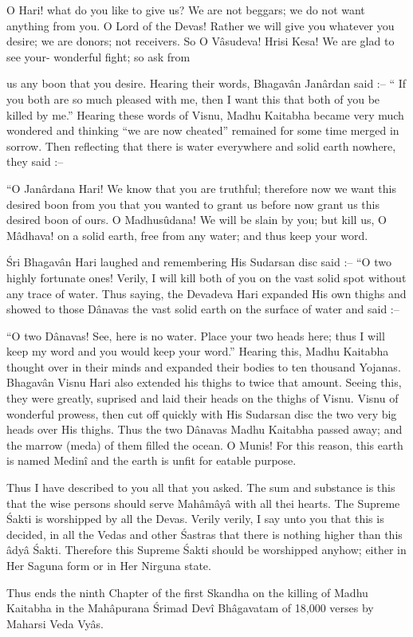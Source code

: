 O Hari! what do you like to give us? We are not beggars; we do not want anything from you. O Lord of the Devas! Rather we will give you whatever you desire; we are donors; not receivers. So O V\^asudeva! Hrisi Kesa! We are glad to see your- wonderful fight; so ask from

us any boon that you desire. Hearing their words, Bhagav\^an Jan\^ardan said :-- `` If you both are so much pleased with me, then I want this that both of you be killed by me.'' Hearing these words of Visnu, Madhu Kaitabha became very much wondered and thinking ``we are now cheated'' remained for some time merged in sorrow. Then reflecting that there is water everywhere and solid earth nowhere, they said :--

``O Jan\^ardana Hari! We know that you are truthful; therefore now we want this desired boon from you that you wanted to grant us before now grant us this desired boon of ours. O Madhus\^udana! We will be slain by you; but kill us, O M\^adhava! on a solid earth, free from any water; and thus keep your word.

\'Sri Bhagav\^an Hari laughed and remembering His Sudarsan disc said :-- ``O two highly fortunate ones! Verily, I will kill both of you on the vast solid spot without any trace of water. Thus saying, the Devadeva Hari expanded His own thighs and showed to those D\^anavas the vast solid earth on the surface of water and said :--

``O two D\^anavas! See, here is no water. Place your two heads here; thus I will keep my word and you would keep your word.'' Hearing this, Madhu Kaitabha thought over in their minds and expanded their bodies to ten thousand Yojanas. Bhagav\^an Visnu Hari also extended his thighs to twice that amount. Seeing this, they were greatly, suprised and laid their heads on the thighs of Visnu. Visnu of wonderful prowess, then cut off quickly with His Sudarsan disc the two very big heads over His thighs. Thus the two D\^anavas Madhu Kaitabha passed away; and the marrow (meda) of them filled the ocean. O Munis! For this reason, this earth is named Medin\^i and the earth is unfit for eatable purpose.

Thus I have described to you all that you asked. The sum and substance is this that the wise persons should serve Mah\^am\^ay\^a with all thei hearts. The Supreme \'Sakti is worshipped by all the Devas. Verily verily, I say unto you that this is decided, in all the Vedas and other \'Sastras that there is nothing higher than this \^ady\^a \'Sakti. Therefore this Supreme \'Sakti should be worshipped anyhow; either in Her Saguna form or in Her Nirguna state.

Thus ends the ninth Chapter of the first Skandha on the killing of Madhu Kaitabha in the Mah\^apurana \'Srimad Dev\^i Bh\^agavatam of 18,000 verses by Maharsi Veda Vy\^as.